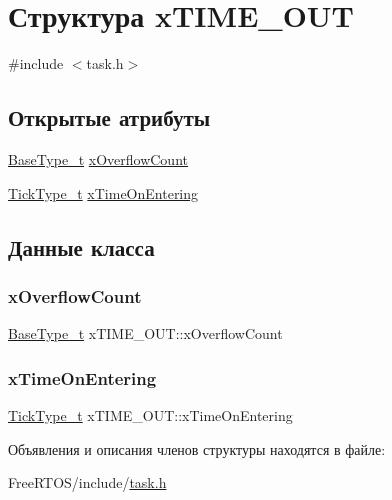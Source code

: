 \hypertarget{structx_t_i_m_e___o_u_t}{}\section{Структура x\+T\+I\+M\+E\+\_\+\+O\+UT}
\label{structx_t_i_m_e___o_u_t}


{\ttfamily \#include $<$task.\+h$>$}

\subsection*{Открытые атрибуты}
\begin{DoxyCompactItemize}
\item 
\mbox{\hyperlink{portmacro_8h_a46fb21e00ae0729d7515c0fbf2269796}{Base\+Type\+\_\+t}} \mbox{\hyperlink{structx_t_i_m_e___o_u_t_a9289c6f97096a9b3e3fc705d0bc5a160}{x\+Overflow\+Count}}
\item 
\mbox{\hyperlink{portmacro_8h_aa69c48c6e902ce54f70886e6573c92a9}{Tick\+Type\+\_\+t}} \mbox{\hyperlink{structx_t_i_m_e___o_u_t_a3464939ca050f7bcc6ffe0d8d3766337}{x\+Time\+On\+Entering}}
\end{DoxyCompactItemize}


\subsection{Данные класса}
\mbox{\label{structx_t_i_m_e___o_u_t_a9289c6f97096a9b3e3fc705d0bc5a160}} 
\subsubsection{\texorpdfstring{xOverflowCount}{xOverflowCount}}
{\footnotesize\ttfamily \mbox{\hyperlink{portmacro_8h_a46fb21e00ae0729d7515c0fbf2269796}{Base\+Type\+\_\+t}} x\+T\+I\+M\+E\+\_\+\+O\+U\+T\+::x\+Overflow\+Count}

\mbox{\label{structx_t_i_m_e___o_u_t_a3464939ca050f7bcc6ffe0d8d3766337}} 
\subsubsection{\texorpdfstring{xTimeOnEntering}{xTimeOnEntering}}
{\footnotesize\ttfamily \mbox{\hyperlink{portmacro_8h_aa69c48c6e902ce54f70886e6573c92a9}{Tick\+Type\+\_\+t}} x\+T\+I\+M\+E\+\_\+\+O\+U\+T\+::x\+Time\+On\+Entering}



Объявления и описания членов структуры находятся в файле\+:\begin{DoxyCompactItemize}
\item 
Free\+R\+T\+O\+S/include/\mbox{\hyperlink{task_8h}{task.\+h}}\end{DoxyCompactItemize}

